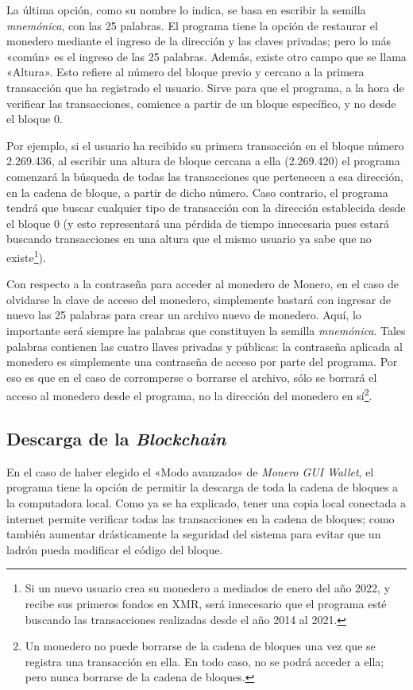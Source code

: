 \documentclass[12pt,a4paper,twoside]{book}
\begin{document}
La última opción, como su nombre lo indica, se basa en escribir la semilla \textit{mnemónica}, con las 25 palabras. El programa tiene la opción de restaurar el monedero mediante el ingreso de la dirección y las claves privadas; pero lo más «común» es el ingreso de las 25 palabras. Además, existe otro campo que se llama «Altura». Esto refiere al número del bloque previo y cercano a la primera transacción que ha registrado el usuario. Sirve para que el programa, a la hora de verificar las transacciones, comience a partir de un bloque específico, y no desde el bloque 0.

Por ejemplo, si el usuario ha recibido su primera transacción en el bloque número 2.269.436, al escribir una altura de bloque cercana a ella (2.269.420) el programa comenzará la búsqueda de todas las transacciones que pertenecen a esa dirección, en la cadena de bloque, a partir de dicho número. Caso contrario, el programa tendrá que buscar cualquier tipo de transacción con la dirección establecida desde el bloque 0 (y esto representará una pérdida de tiempo innecesaria pues estará buscando transacciones en una altura que el mismo usuario ya sabe que no existe\footnote{Si un nuevo usuario crea su monedero a mediados de enero del año 2022, y recibe sus primeros fondos en XMR, será innecesario que el programa esté buscando las transacciones realizadas desde el año 2014 al 2021.}).

Con respecto a la contraseña para acceder al monedero de Monero, en el caso de olvidarse la clave de acceso del monedero, simplemente bastará con ingresar de nuevo las 25 palabras para crear un archivo nuevo de monedero. Aquí, lo importante será siempre las palabras que constituyen la semilla \textit{mnemónica}. Tales palabras contienen las cuatro llaves privadas y públicas: la contraseña aplicada al monedero es simplemente una contraseña de acceso por parte del programa. Por eso es que en el caso de corromperse o borrarse el archivo, sólo se borrará el acceso al monedero desde el programa, no la dirección del monedero en sí\footnote{Un monedero no puede borrarse de la cadena de bloques una vez que se registra una transacción en ella. En todo caso, no se podrá acceder a ella; pero nunca borrarse de la cadena de bloques.}.

\subsection{Descarga de la \textit{Blockchain}}
En el caso de haber elegido el «Modo avanzado» de \textit{Monero GUI Wallet}, el programa tiene la opción de permitir la descarga de toda la cadena de bloques a la computadora local. Como ya se ha explicado, tener una copia local conectada a internet permite verificar todas las transacciones en la cadena de bloques; como también aumentar drásticamente la seguridad del sistema para evitar que un ladrón pueda modificar el código del bloque.
\end{document}
